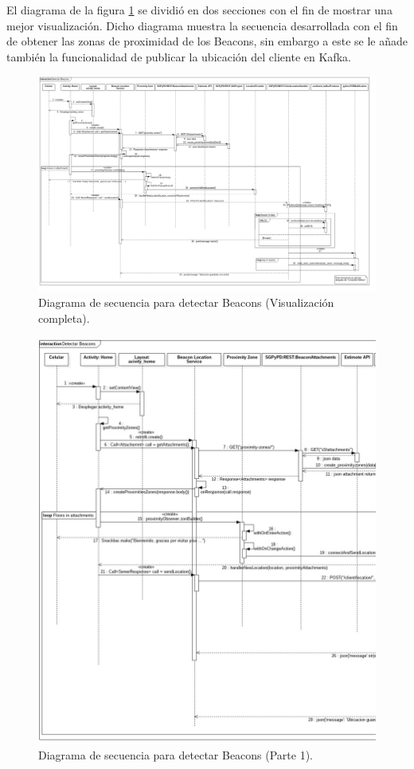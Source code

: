El diagrama de la figura \ref{image:detecta2} se dividió en dos secciones con el fin de mostrar una mejor visualización. Dicho diagrama muestra la secuencia desarrollada con el fin de obtener las zonas de proximidad de los Beacons, sin embargo a este se le añade también la funcionalidad de publicar la ubicación del cliente en Kafka.
\FloatBarrier
\begin{figure}[htbp!]
		\centering
			\includegraphics[width=1.1 \textwidth]{imagenes/Diagramas_UserApp/Nuevos_diagramas/detectarBeacons2}
		\caption{Diagrama de secuencia para detectar Beacons (Visualización completa).}
		\label{image:detecta2}
\end{figure}
\FloatBarrier

\FloatBarrier
\begin{figure}[htbp!]
		\centering
			\includegraphics[width=1 \textwidth]{imagenes/Diagramas_UserApp/Nuevos_diagramas/detectarBeacons2P1}
		\caption{Diagrama de secuencia para detectar Beacons (Parte 1).}
		\label{image:detecta21}
\end{figure}
\FloatBarrier

